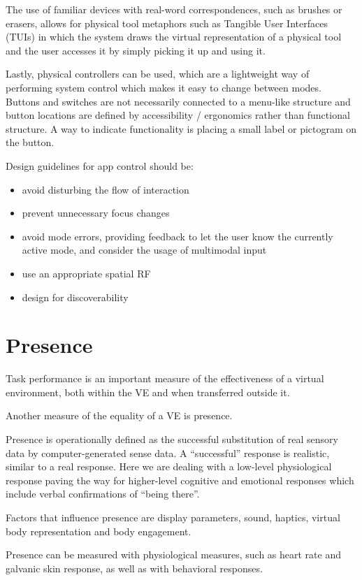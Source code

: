 \documentclass[a4paper]{article}
\begin{document}
The use of familiar devices with real-word correspondences, such as brushes or erasers, allows for physical tool metaphors such as Tangible User Interfaces (TUIs) in which the system draws the virtual representation of a physical tool and the user accesses it by simply picking it up and using it.

Lastly, physical controllers can be used, which are a lightweight way of performing system control which makes it easy to change between modes.
Buttons and switches are not necessarily connected to a menu-like structure and button locations are defined by accessibility / ergonomics rather than functional structure.
A way to indicate functionality is placing a small label or pictogram on the button.

Design guidelines for app control should be:
\begin{itemize}
  \item avoid disturbing the flow of interaction
  \item prevent unnecessary focus changes
  \item avoid mode errors, providing feedback to let the user know the currently active mode, and consider the usage of multimodal input
  \item use an appropriate spatial RF
  \item design for discoverability
\end{itemize}


\section{Presence}

Task performance is an important measure of the effectiveness of a
virtual environment, both within the VE and when transferred outside it.

Another measure of the equality of a VE is presence.

Presence is operationally defined as the successful substitution of real
sensory data by computer-generated sense data.
A ``successful'' response
is realistic, similar to a real response.
Here we are dealing with a
low-level physiological response paving the way for higher-level
cognitive and emotional responses which include verbal confirmations of
``being there''.

Factors that influence presence are display parameters, sound, haptics,
virtual body representation and body engagement.

Presence can be measured with physiological measures, such as heart rate
and galvanic skin response, as well as with behavioral responses.
\end{document}
